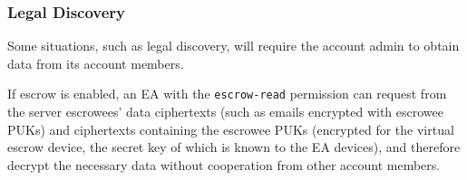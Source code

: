 \subsubsection{Legal Discovery}
\label{subsubsec:legaldiscovery}

Some situations, such as legal discovery, will require the account admin to obtain data from its
account members.

If escrow is enabled, an EA with the \texttt{escrow-read} permission can request from the server
escrowees' data ciphertexts (such as emails encrypted with escrowee PUKs) and ciphertexts containing
the escrowee PUKs (encrypted for the virtual escrow device, the secret key of which is known to the
EA devices), and therefore decrypt the necessary data without cooperation from other account
members.
